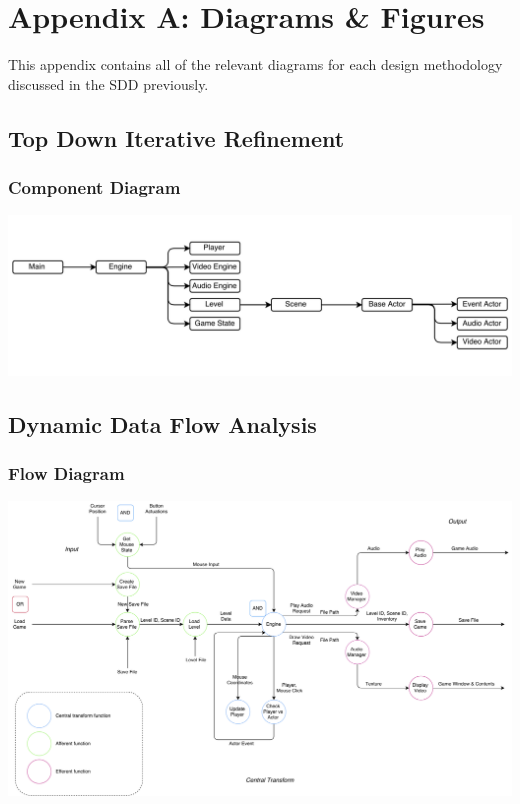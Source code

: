 \documentclass{article}
\begin{document}
%
%
\newpage
\section{Appendix A: Diagrams \& Figures}
	This appendix contains all of the relevant diagrams for each design methodology discussed in the SDD previously.
	\subsection{Top Down Iterative Refinement}
		\subsubsection{Component Diagram}
			\begin{center}
				\includegraphics[scale=0.4,angle=90]{Top_down.png}
			\end{center}
	\subsection{Dynamic Data Flow Analysis}
		\subsubsection{Flow Diagram}
			\begin{center}
				\includegraphics[scale=0.40,angle=90]{ddfFlow.png}
			\end{center}
\end{document}

